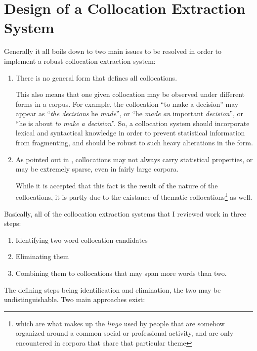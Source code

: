 \documentclass[a4paper,12pt,oneside]{article}
\begin{document}
\section{Design of a Collocation Extraction System}
Generally it all boils down to two main issues to be resolved in order to implement a robust collocation extraction system:
\begin{enumerate}
\item There is no general form that defines all collocations. 

      This also means that one given collocation may be observed under different forms in a corpus. 
      For example, the collocation ``to make a decision'' may appear as ``\textit{the decisions} he \textit{made}'', or ``he \textit{made an} important \textit{decision}'', or ``he is about \textit{to make a decision}''. 
      So, a collocation system should incorporate lexical and syntactical knowledge in order to prevent statistical information from fragmenting, and should be robust to such heavy alterations in the form.
\item As pointed out in \cite{1118854}, collocations may not always carry statistical properties, or may be extremely sparse, even in fairly large corpora.

      While it is accepted that this fact is the result of the nature of the collocations, it is partly due to the existance of thematic collocations\footnote{which are what makes up the \emph{lingo} used by people that are somehow organized around a common social or professional activity, and are only encountered in corpora that share that particular theme} as well.
\end{enumerate}

Basically, all of the collocation extraction systems that I reviewed work in three steps:
\begin{enumerate}
\item Identifying two-word collocation candidates
\item Eliminating them
\item Combining them to collocations that may span more words than two.
\end{enumerate}

The defining steps being identification and elimination, the two may be undistinguishable. Two main approaches exist:
\end{document}
